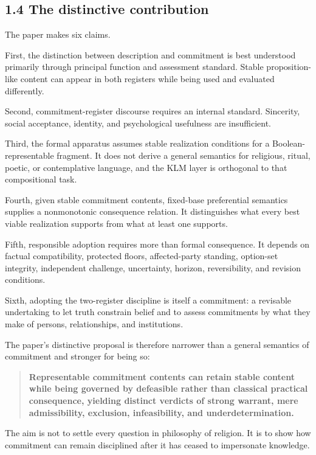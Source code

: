 \documentclass[
  11pt,
]{article}
\begin{document}
\subsection{1.4 The distinctive
contribution}\label{the-distinctive-contribution}

The paper makes six claims.

First, the distinction between description and commitment is best
understood primarily through principal function and assessment standard.
Stable proposition-like content can appear in both registers while being
used and evaluated differently.

Second, commitment-register discourse requires an internal standard.
Sincerity, social acceptance, identity, and psychological usefulness are
insufficient.

Third, the formal apparatus assumes stable realization conditions for a
Boolean-representable fragment. It does not derive a general semantics
for religious, ritual, poetic, or contemplative language, and the KLM
layer is orthogonal to that compositional task.

Fourth, given stable commitment contents, fixed-base preferential
semantics supplies a nonmonotonic consequence relation. It distinguishes
what every best viable realization supports from what at least one
supports.

Fifth, responsible adoption requires more than formal consequence. It
depends on factual compatibility, protected floors, affected-party
standing, option-set integrity, independent challenge, uncertainty,
horizon, reversibility, and revision conditions.

Sixth, adopting the two-register discipline is itself a commitment: a
revisable undertaking to let truth constrain belief and to assess
commitments by what they make of persons, relationships, and
institutions.

The paper's distinctive proposal is therefore narrower than a general
semantics of commitment and stronger for being so:

\begin{quote}
\textbf{Representable commitment contents can retain stable content
while being governed by defeasible rather than classical practical
consequence, yielding distinct verdicts of strong warrant, mere
admissibility, exclusion, infeasibility, and underdetermination.}
\end{quote}

The aim is not to settle every question in philosophy of religion. It is
to show how commitment can remain disciplined after it has ceased to
impersonate knowledge.
\end{document}
